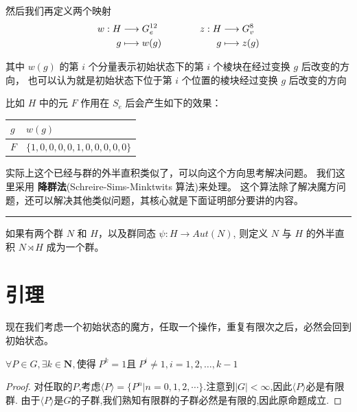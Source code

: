 \documentclass{beamer}
\newcommand{\lr}{\ensuremath{\longrightarrow}}
\newcommand{\sr}{\ensuremath{\longmapsto}}
\begin{document}
\begin{frame}
然后我们再定义两个映射 
\begin{align}
    \begin{aligned}
        w: H & \lr G_e^{12} \\
        g & \sr w(g) 
    \end{aligned}
    \hspace*{4em}
    \begin{aligned}
        z: H & \lr G_v^{8} \\
        g & \sr z(g) 
    \end{aligned}
\end{align}

其中 $w(g)$ 的第 $i$ 个分量表示初始状态下的第 $i$ 个棱块在经过变换 $g$ 后改变的方向，
也可以认为就是初始状态下位于第 $i$ 个位置的棱块经过变换 $g$ 后改变的方向
\end{frame} 

\begin{frame}
    比如 $H$ 中的元 $F$ 作用在 $S_e$ 后会产生如下的效果：
\begin{center}
    \begin{tabular}{p{.4\linewidth}p{.4\linewidth}}
        \toprule
        $g$ & $w(g)$\\
        \hline
        $F$ & $\{1,0,0,0,0,1,0,0,0,0,0\}$\\
        \bottomrule
    \end{tabular}
\end{center}
\end{frame} 

\begin{frame}
    实际上这个已经与群的外半直积类似了，可以向这个方向思考解决问题。
我们这里采用 {\bf 降群法}(Schreire-Sims-Minktwits 算法)来处理。
这个算法除了解决魔方问题，还可以解决其他类似问题，其核心就是下面证明部分要讲的内容。

\vspace*{6em}
\noindent\rule{1\linewidth}{2pt}

{
    \kaishu 
    如果有两个群 $N$ 和 $H$，以及群同态 $\psi:H \lr Aut(N)$, 则定义 $N$ 与 $H$
的外半直积 $N\rtimes H$ 成为一个群。
}
\end{frame} 




\section{引理}
\begin{frame}
    现在我们考虑一个初始状态的魔方，任取一个操作，重复有限次之后，必然会回到初始状态。
\begin{lemma}[有限群]
	$\forall P \in G,\exists k \in \mathbf{N},\mbox{使得}\; P^k = 1\mbox{且}\; P^{i} \neq 1,i = 1,2,\ldots,k-1$	
\end{lemma}
\begin{proof}
	对任取的$P$,考虑$\langle P\rangle = \{P^n|n=0,1,2,\cdots \}$.注意到$\left|G\right| < \infty$,因此$\langle P\rangle$必是有限群.
	由于$\langle P\rangle$是$G$的子群,我们熟知有限群的子群必然是有限的,因此原命题成立.
\end{proof}
\end{frame} 
\end{document}
